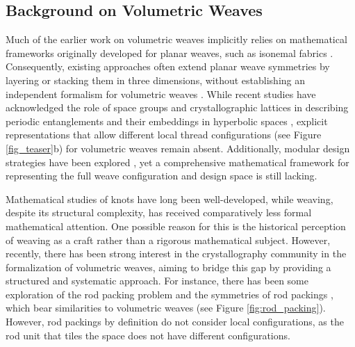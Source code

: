 \documentclass[unnumsec,webpdf,contemporary,large]{oup-authoring-template}%
\theoremstyle{thmstyleone}%
\theoremstyle{thmstyletwo}%
\theoremstyle{thmstylethree}%
\newcommand{\ergun}[1]{{\color{black} #1}}
\begin{document}
\ergun{
\subsection{Background on Volumetric Weaves}

Much of the earlier work on volumetric weaves implicitly relies on mathematical frameworks originally developed for planar weaves, such as isonemal fabrics \cite{Grunbaum80,Grunbaum85,Grunbaum86,grunbaum1988isonemal}. Consequently, existing approaches often extend planar weave symmetries by layering or stacking them in three dimensions, without establishing an independent formalism for volumetric weaves \cite{STIG20121495}. While recent studies have acknowledged the role of space groups and crystallographic lattices in describing periodic entanglements \cite{O'Keeffe:cryst2-period, periodic_geo_knots} and their embeddings in hyperbolic spaces \cite{periodic_entanglement_2, ideal_geometry_periodic_entanglement_2}, explicit representations that allow different local thread configurations (see Figure \ref{fig_teaser}b) for volumetric weaves remain absent. Additionally, modular design strategies have been explored \cite{derck3dpatent, Lord2006}, yet a comprehensive mathematical framework for representing the full weave configuration and design space is still lacking.

Mathematical studies of knots have long been well-developed, while weaving, despite its structural complexity, has received comparatively less formal mathematical attention. One possible reason for this is the historical perception of weaving as a craft rather than a rigorous mathematical subject. However, recently, there has been strong interest in the crystallography community in the formalization of volumetric weaves, aiming to bridge this gap by providing a structured and systematic approach. For instance, there has been some exploration of the rod packing problem \cite{rosi2005rodpacking, okeefe1977rodpacking} and the symmetries of rod packings \cite{okeeffe2001invariant_cubic_rod_packing}, which bear similarities to volumetric weaves (see Figure \ref{fig:rod_packing}). However, rod packings by definition do not consider local configurations, as the rod unit that tiles the space does not have different configurations. 

}
\end{document}
